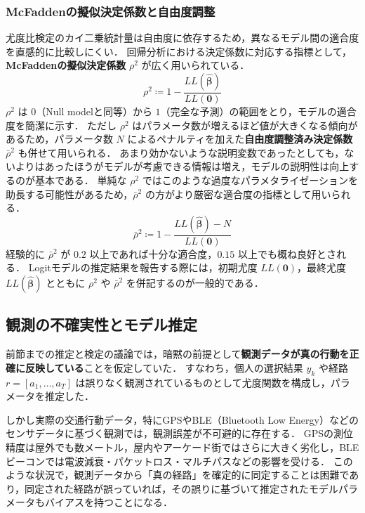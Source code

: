 \subsubsection{McFaddenの擬似決定係数と自由度調整}
尤度比検定のカイ二乗統計量は自由度に依存するため，異なるモデル間の適合度を直感的に比較しにくい．
回帰分析における決定係数に対応する指標として，\textbf{McFaddenの擬似決定係数} $\rho^2$ が広く用いられている．
\begin{equation}
    \rho^2 \coloneq 1-\frac{LL(\bm{\hat\beta})}{LL(\bm 0)}
\end{equation}
$\rho^2$ は $0$（Null modelと同等）から $1$（完全な予測）の範囲をとり，モデルの適合度を簡潔に示す．
ただし $\rho^2$ はパラメータ数が増えるほど値が大きくなる傾向があるため，パラメータ数 $N$ によるペナルティを加えた\textbf{自由度調整済み決定係数} $\bar\rho^2$ も併せて用いられる．
あまり効かないような説明変数であったとしても，ないよりはあったほうがモデルが考慮できる情報は増え，モデルの説明性は向上するのが基本である．
単純な $\rho^2$ ではこのような過度なパラメタライゼーションを助長する可能性があるため，$\bar\rho^2$ の方がより厳密な適合度の指標として用いられる．
\begin{equation}
    \bar\rho^2 \coloneq 1-\frac{LL(\bm{\hat\beta})-N}{LL(\bm 0)}
\end{equation}
経験的に $\bar\rho^2$ が $0.2$ 以上であれば十分な適合度，$0.15$ 以上でも概ね良好とされる．
Logitモデルの推定結果を報告する際には，初期尤度 $LL(\bm{0})$，最終尤度 $LL(\hat{\bm\beta})$ とともに $\rho^2$ や $\bar\rho^2$ を併記するのが一般的である．


\subsection{観測の不確実性とモデル推定}\label{sec:observation_uncertainty}

前節までの推定と検定の議論では，暗黙の前提として\textbf{観測データが真の行動を正確に反映している}ことを仮定していた．
すなわち，個人の選択結果 $y_k$ や経路 $r = [a_1, \ldots, a_T]$ は誤りなく観測されているものとして尤度関数を構成し，パラメータを推定した．

しかし実際の交通行動データ，特にGPSやBLE（Bluetooth Low Energy）などのセンサデータに基づく観測では，観測誤差が不可避的に存在する．
GPSの測位精度は屋外でも数メートル，屋内やアーケード街ではさらに大きく劣化し，BLEビーコンでは電波減衰・パケットロス・マルチパスなどの影響を受ける．
このような状況で，観測データから「真の経路」を確定的に同定することは困難であり，同定された経路が誤っていれば，その誤りに基づいて推定されたモデルパラメータもバイアスを持つことになる．

